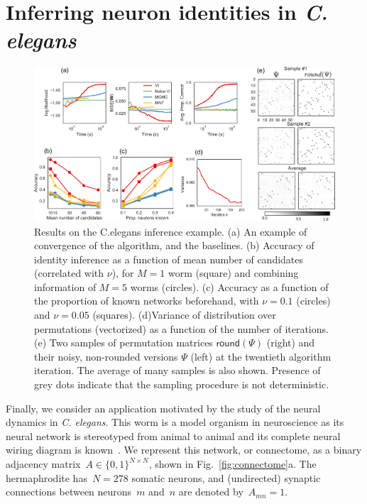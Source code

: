 \documentclass[twoside]{article}
\begin{document}
\section{Inferring neuron identities in \textit{C. elegans}}
\label{sec:celegans}

\begin{figure}[ht]
  \centering
  \includegraphics[width=6in]{../figures/figure7.pdf} 
  \caption{Results on the C.elegans inference example. (a) An example of convergence of the algorithm, and the baselines. (b) Accuracy of identity inference as a function of mean number of candidates (correlated with $\nu$), for $M=1$ worm (square) and combining information of $M=5$ worms (circles). (c) Accuracy as a function of the proportion of known networks beforehand,  with $\nu=0.1$ (circles) and $\nu=0.05$ (squares). (d)Variance of distribution over permutations (vectorized) as a function of the number of iterations. (e) Two samples of permutation matrices $\mathsf{round}(\Psi)$ (right) and their noisy, non-rounded versions $\Psi$ (left) at the twentieth algorithm iteration. The average of many samples is also shown. Presence of grey dots indicate that the sampling procedure is not deterministic.}
\label{fig:elegantresults}
\end{figure}


Finally, we consider an application motivated by the study of the
neural dynamics in \textit{C. elegans}. This worm is a model organism
in neuroscience as its neural network is stereotyped from animal to
animal and its complete neural wiring diagram is
known~\citep{varshney2011structural}.  We represent this network, or
connectome, as a binary adjacency
matrix~${A \in \{0,1\}^{N \times N}}$, shown in
Fig.~\ref{fig:connectome}a. The hermaphrodite has~${N=278}$ somatic
neurons, and (undirected) synaptic connections between neurons~$m$
and~$n$ are denoted by~$A_{mn}=1$.
\end{document}
